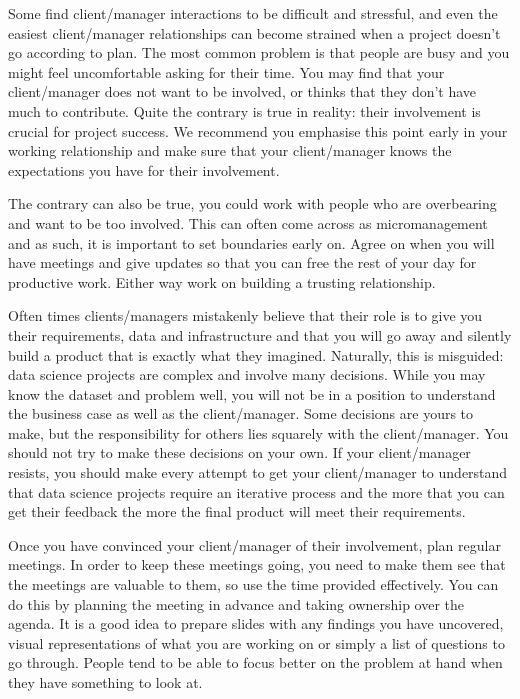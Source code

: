\documentclass[
]{book}
\begin{document}
Some find client/manager interactions to be difficult and stressful, and
even the easiest client/manager relationships can become strained when a
project doesn't go according to plan. The most common problem is that
people are busy and you might feel uncomfortable asking for their time.
You may find that your client/manager does not want to be involved, or
thinks that they don't have much to contribute. Quite the contrary is
true in reality: their involvement is crucial for project success. We
recommend you emphasise this point early in your working relationship
and make sure that your client/manager knows the expectations you have
for their involvement.

The contrary can also be true, you could work with people who are
overbearing and want to be too involved. This can often come across as
micromanagement and as such, it is important to set boundaries early on.
Agree on when you will have meetings and give updates so that you can
free the rest of your day for productive work. Either way work on
building a trusting relationship.

Often times clients/managers mistakenly believe that their role is to
give you their requirements, data and infrastructure and that you will
go away and silently build a product that is exactly what they imagined.
Naturally, this is misguided: data science projects are complex and
involve many decisions. While you may know the dataset and problem well,
you will not be in a position to understand the business case as well as
the client/manager. Some decisions are yours to make, but the
responsibility for others lies squarely with the client/manager. You
should not try to make these decisions on your own. If your
client/manager resists, you should make every attempt to get your
client/manager to understand that data science projects require an
iterative process and the more that you can get their feedback the more
the final product will meet their requirements.

Once you have convinced your client/manager of their involvement, plan
regular meetings. In order to keep these meetings going, you need to
make them see that the meetings are valuable to them, so use the time
provided effectively. You can do this by planning the meeting in advance
and taking ownership over the agenda. It is a good idea to prepare
slides with any findings you have uncovered, visual representations of
what you are working on or simply a list of questions to go through.
People tend to be able to focus better on the problem at hand when they
have something to look at.
\end{document}
